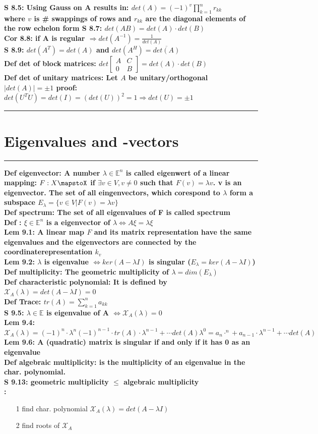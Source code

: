 \documentclass[7pt,landscape, margin = 0.1mm]{article}
\newcommand{\titellinie}{\rule{1.\linewidth}{0.75pt}}
\newcommand*{\mysection}[2][black]{\vskip 0pt \titellinie\vspace{-20pt}\section{#2}\vspace{-14pt}\titellinie \colorlet{chaptercolor}{#1}}
\newcommand{\KRZ}[2]{\vspace{1mm} \hline \vspace{1mm} \color{chaptercolor}{RC #1}:\color{black} \   \hspace{0.2cm}\vspace{1mm}   {\begin{minipage}{20em}
#2 \end{minipage}} \vspace{1mm}  \hline \vspace{1mm}  \\}
\newcommand{\DEF}[2]{\color{chaptercolor}\bf{Def #1}:\color{black}    \hspace{0.2cm} #2 \\}
\newcommand{\COR}[2]{\color{chaptercolor}\bf{Cor #1}:\color{black}    \hspace{0.2cm} #2 \\}
\newcommand{\LEM}[2]{\color{chaptercolor}\bf{Lem #1}:\color{black}    \hspace{0.2cm} #2 \\}
\newcommand{\SA}[2]{\color{chaptercolor}\bf{S #1}:\color{black}    \hspace{0.2cm} #2 \\}
\begin{document}
\begin{multicols}{4}
\begin{flushleft}
\SA{8.5}{Using Gauss on A results in: $det(A) = (-1)^v \prod_{k=1}^{n}r_{kk} $} where $v$ is \# swappings of rows and $r_{kk}$ are the diagonal elements of the row echelon form
\SA{8.7}{$det(AB)=det(A)\cdot det(B)$}
\COR{8.8}{if A is regular $\Rightarrow det (A^{-1})= \frac{1}{det(A)} $}
\SA{8.9}{$det(A^T)=det(A) $ and $det(A^H)=\overline{det(A)} $}
\DEF{det of block matrices}{$det \left[ 
\begin{array}{c|c} 
  A & C \\ 
  \hline 
  0 & B
\end{array} 
\right]  = det (A)\cdot det(B)$}
\DEF{det of unitary matrices}{Let $A $ be unitary/orthogonal $ |det(A)|=\pm 1 $ proof: $det(U^TU) = det(I)= (det(U))^2 = 1 \Rightarrow det(U)= \pm 1 $}
\mysection[Magenta]{\centering Eigenvalues and -vectors}
\DEF{eigenvector}{A number $\lambda \in \mathbb{E}^n$ is called eigenwert of a linear mapping: $F: X\mapstoX$ if $\exists v \in V, v \neq 0$ such that $F(v) = \lambda v$. v is an eigenvector. The set of all eingenvectors, which corespond to $\lambda$ form a subspace $E_{\lambda} = \{ v \in V |F(v) = \lambda v \}$}
\DEF{spectrum}{The set of all eigenvalues of F is called spectrum}
\DEF{}{$\xi \in \mathbb{E}^n$ is a eigenvector of $\lambda \Leftrightarrow A\xi = \lambda \xi$}
\LEM{9.1}{A linear map $F$ and its matrix representation have the same eigenvalues and the eigenvectors are connected by the coordinaterepresentation $k_v$}
\LEM{9.2}{$\lambda $ is eigenvalue $\Leftrightarrow ker(A-\lambda I) $ is singular ($E_{\lambda} = ker(A-\lambda I) $)}
\DEF{multiplicity}{The geometric multiplicity of $\lambda  = dim (E_{\lambda})$ }
\DEF{characteristic polynomial}{It is defined by $ \mathcal{X}_A(\lambda)= det(A-\lambda I)=0$}
\DEF{Trace}{$tr(A) = \sum_{k=1}^{n}a_{kk} $ }
\SA{9.5}{$\lambda \in \mathbb{E}$ is eigenvalue of A $\Leftrightarrow \mathcal{X}_A(\lambda)=0$}
\LEM{9.4}{$ \mathcal{X}_A(\lambda)= (-1)^{n}\cdot \lambda^{n} (-1)^{n-1}\cdot tr(A) \cdot \lambda^{n-1} + \cdots det(A)\lambda^0 = a_n \cdot^n + a_{n-1}\cdot  \lambda^{n-1} + \cdots det(A)$}
\LEM{9.6}{A (quadratic) matrix is singular if and only if it has 0 as an eigenvalue}
\DEF{algebraic multiplicity}{ is the  multiplicity of an eigenvalue in the char. polynomial.}
\SA{9.13}{geometric multiplicity $\leq $ algebraic multiplicity}
\KRZ{Find Eigenvalues and -vectors}{\begin{itemize}
\item[1] find char. polynomial $\mathcal{X}_A(\lambda)= det(A-\lambda I) $
\item[2] find roots of $\mathcal{X}_A$ 

\end{itemize}}
\end{flushleft}
\end{multicols}
\end{document}
